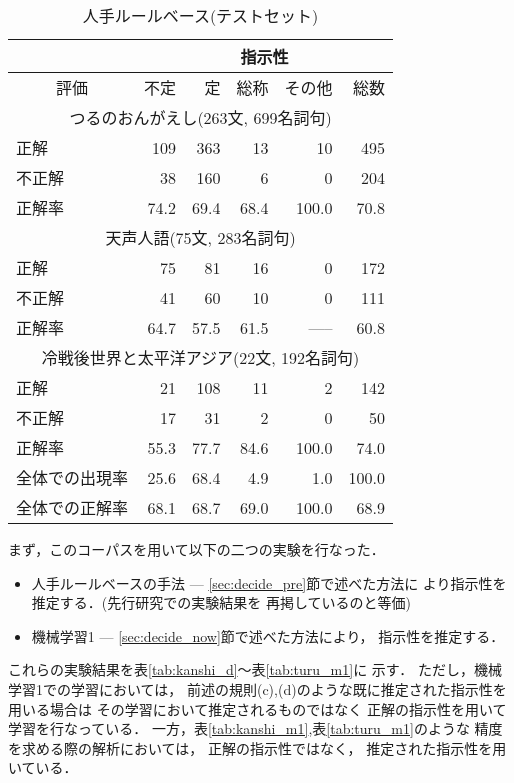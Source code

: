 \begin{table}[t]
\small

  \caption{人手ルールベース(テストセット)}\label{tab:turu_d}

\begin{center}


{

\begin{tabular}[c]{|l|r|r|r|r|r|} \hline
 & \multicolumn{5}{|c|}{指示性}  \\ \hline 
\multicolumn{1}{|c|}{評価}  &  不定  &  定    &  総称 &  その他 &   総数   \\ \hline 
\multicolumn{6}{|c|}{つるのおんがえし(263文, 699名詞句)} \\ \hline 
   正解   &     109  &    363  &      13  &      10  &   495   \\
  不正解  &      38  &     160  &       6  &       0  &     204 \\
\hline
  正解率   &    74.2  &    69.4  &    68.4  &   100.0  &    70.8 \\\hline
\multicolumn{6}{|c|}{天声人語(75文, 283名詞句)} \\ \hline 
   正解   &      75  &    81  &      16  &       0  &   172  \\
  不正解  &      41  &      60  &      10  &       0  &     111  \\
\hline
  正解率   &    64.7  &    57.5  &    61.5  &    ----- &    60.8   \\\hline
\multicolumn{6}{|c|}{冷戦後世界と太平洋アジア(22文, 192名詞句)} \\\hline 
   正解   &      21  &    108  &      11  &       2  &  142  \\
  不正解  &      17  &      31  &       2  &       0  &      50  \\
\hline
  正解率   &    55.3  &    77.7  &    84.6  &   100.0  &    74.0   \\\hline
全体での出現率 &  25.6  &  68.4  &  4.9   &  1.0   &  100.0 \\
全体での正解率 &  68.1   &  68.7 &  69.0 &  100.0  &  68.9  \\\hline
\end{tabular}
}
\end{center}
\end{table}

まず，このコーパスを用いて以下の二つの実験を行なった．
\begin{itemize}
\item 
  人手ルールベースの手法 --- \ref{sec:decide_pre}節で述べた方法に
  より指示性を推定する．(先行研究\cite{murata_ref_nlp}での実験結果を
  再掲しているのと等価)

\item 
  機械学習1 --- \ref{sec:decide_now}節で述べた方法により，
  指示性を推定する．

\end{itemize}
これらの実験結果を表\ref{tab:kanshi_d}〜表\ref{tab:turu_m1}に
示す．
ただし，機械学習1での学習においては，
前述の規則(c),(d)のような既に推定された指示性を用いる場合は
その学習において推定されるものではなく
正解の指示性を用いて学習を行なっている．
一方，表\ref{tab:kanshi_m1},表\ref{tab:turu_m1}のような
精度を求める際の解析においては，
正解の指示性ではなく，
推定された指示性を用いている．

